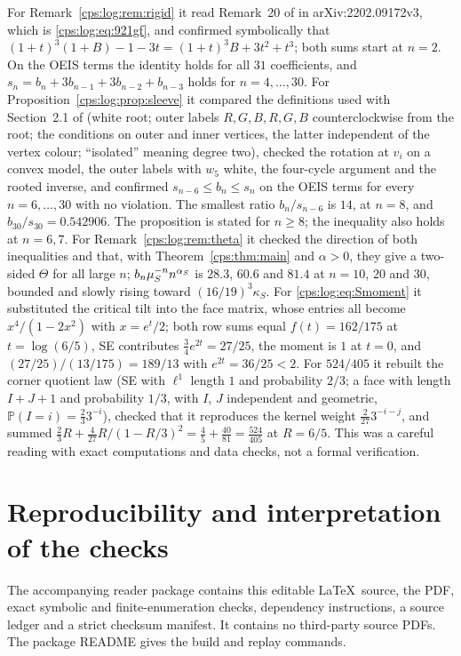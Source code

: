 \documentclass[11pt,letterpaper]{article}
\numberwithin{equation}{section}
\theoremstyle{remark}\newtheorem{remark}[theorem]{Remark}
\newcommand{\PP}{\mathbb P}
\begin{document}
For Remark~\ref{cps:log:rem:rigid} it read Remark~20 of \cite{FNS} in arXiv:2202.09172v3, which
is \eqref{cps:log:eq:921gf}, and confirmed symbolically that
$(1+t)^3(1+B)-1-3t=(1+t)^3B+3t^2+t^3$; both sums start at $n=2$. On the OEIS terms the identity
holds for all $31$ coefficients, and $s_n=b_n+3b_{n-1}+3b_{n-2}+b_{n-3}$ holds for
$n=4,\ldots,30$. For Proposition~\ref{cps:log:prop:sleeve} it compared the definitions used with
Section~2.1 of \cite{FNS} (white root; outer labels $R,G,B,R,G,B$ counterclockwise from the root;
the conditions on outer and inner vertices, the latter independent of the vertex colour;
``isolated'' meaning degree two), checked the rotation at $v_i$ on a convex model, the outer
labels with $w_5$ white, the four-cycle argument and the rooted inverse, and confirmed
$s_{n-6}\le b_n\le s_n$ on the OEIS terms for every $n=6,\ldots,30$ with no violation. The
smallest ratio $b_n/s_{n-6}$ is $14$, at $n=8$, and $b_{30}/s_{30}=0.542906$. The proposition is
stated for $n\ge8$; the inequality also holds at $n=6,7$. For Remark~\ref{cps:log:rem:theta} it
checked the direction of both inequalities and that, with Theorem~\ref{cps:thm:main} and
$\alpha>0$, they give a two-sided $\Theta$ for all large $n$; $b_n\mu_S^{-n}n^{\alpha_S}$ is $28.3$,
$60.6$ and $81.4$ at $n=10$, $20$ and $30$, bounded and slowly rising toward
$(16/19)^3\kappa_S$. For \eqref{cps:log:eq:Smoment} it substituted the critical tilt into the
face matrix, whose entries all become $x^4/(1-2x^2)$ with $x=e^t/2$; both row sums equal
$f(t)=162/175$ at $t=\log(6/5)$, SE contributes $\tfrac34e^{2t}=27/25$, the moment is $1$ at
$t=0$, and $(27/25)/(13/175)=189/13$ with $e^{2t}=36/25<2$. For $524/405$ it rebuilt the corner
quotient law (SE with $\ell^1$ length $1$ and probability $2/3$; a face with length $I+J+1$ and
probability $1/3$, with $I$, $J$ independent and geometric, $\PP(I=i)=\frac23 3^{-i}$), checked
that it reproduces the kernel weight $\frac2{27}3^{-i-j}$, and summed
$\frac23R+\frac4{27}R/(1-R/3)^2=\frac45+\frac{40}{81}=\frac{524}{405}$ at $R=6/5$. This was a
careful reading with exact computations and data checks, not a formal verification.

\section{Reproducibility and interpretation of the checks}\label{cps:log:sec:repro}
The accompanying reader package contains this editable \LaTeX\ source,
the PDF, exact symbolic and finite-enumeration checks, dependency
instructions, a source ledger and a strict checksum manifest. It
contains no third-party source PDFs. The package README gives the
build and replay commands.
\end{document}

